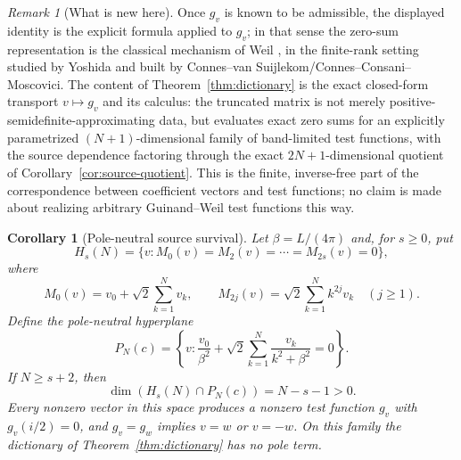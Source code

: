 \documentclass[11pt]{article}
\theoremstyle{plain}
\newtheorem{corollary}[theorem]{Corollary}
\theoremstyle{definition}
\theoremstyle{remark}
\newtheorem{remark}[theorem]{Remark}
\newcommand{\cvs}{Connes--van Suijlekom}
\newcommand{\ccm}{Connes--Consani--Moscovici}
\begin{document}
\begin{remark}[What is new here]\label{rem:prior}
Once $g_v$ is known to be admissible, the displayed identity is the explicit
formula applied to $g_v$; in that sense the zero-sum representation is the
classical mechanism of Weil \cite{Weil1952}, in the finite-rank setting
studied by Yoshida \cite{Yoshida1992} and built by \cvs/\ccm.  The content of
Theorem~\ref{thm:dictionary} is the exact closed-form transport
$v\mapsto g_v$ and its calculus: the truncated matrix is not merely
positive-semidefinite-approximating data, but evaluates exact zero sums for an
explicitly parametrized $(N{+}1)$-dimensional family of band-limited test
functions, with the source dependence factoring through the exact
$2N{+}1$-dimensional quotient of Corollary~\ref{cor:source-quotient}.  This is
the finite, inverse-free part of the correspondence between coefficient
vectors and test functions; no claim is made about realizing arbitrary
Guinand--Weil test functions this way.
\end{remark}

\begin{corollary}[Pole-neutral source survival]\label{cor:pole-neutral}
Let $\beta=L/(4\pi)$ and, for $s\ge0$, put
\[
        H_s(N)=\{v:M_0(v)=M_2(v)=\cdots=M_{2s}(v)=0\},
\]
where
\[
        M_0(v)=v_0+\sqrt2\sum_{k=1}^N v_k,\qquad
        M_{2j}(v)=\sqrt2\sum_{k=1}^N k^{2j}v_k\quad(j\ge1).
\]
Define the pole-neutral hyperplane
\[
        P_N(c)=
        \left\{
        v:\frac{v_0}{\beta^2}
          +\sqrt2\sum_{k=1}^N\frac{v_k}{k^2+\beta^2}=0
        \right\}.
\]
If $N\ge s+2$, then
\[
        \dim(H_s(N)\cap P_N(c))=N-s-1>0.
\]
Every nonzero vector in this space produces a nonzero test function $g_v$
with $g_v(i/2)=0$, and $g_v=g_w$ implies $v=w$ or $v=-w$.  On this family the
dictionary of Theorem~\ref{thm:dictionary} has no pole term.
\end{corollary}
\end{document}
